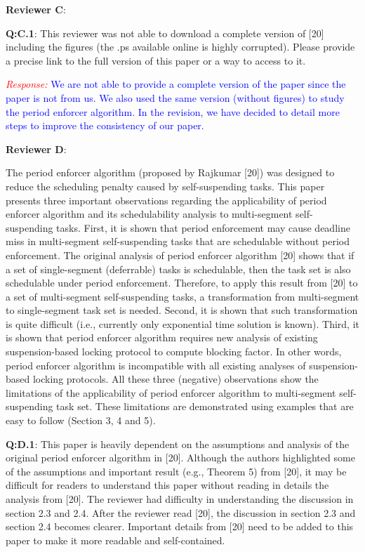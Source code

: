 \documentclass[12pt]{article}
\newcommand{\response}[1]{\textcolor{red}{\emph{Response: }} \textcolor{blue}{#1}\vspace{0.25in}}
\begin{document}
{\bf Reviewer C}:

{\bf Q:C.1}:    
This reviewer was not able to download a complete version of [20] including
the figures (the .ps available online is highly corrupted). Please provide a
precise link to the full version of this paper or a way to access to it. 

\response{We are not able to provide a complete version of the paper since the paper is not from us. We also used the same version (without figures) to study the period enforcer algorithm. In the revision, we have decided to detail more steps to improve the consistency of our paper. }

{\bf Reviewer D}:

	The period enforcer algorithm (proposed by Rajkumar [20]) was designed to
reduce the scheduling penalty caused by self-suspending tasks. This paper
presents three important observations regarding the applicability of period
enforcer algorithm and its schedulability analysis to multi-segment
self-suspending tasks. First, it is shown that period enforcement may cause
deadline miss in multi-segment self-suspending tasks that are schedulable
without period enforcement. The original analysis of period enforcer
algorithm [20] shows that if a set of single-segment (deferrable) tasks is
schedulable, then the task set is also schedulable under period enforcement.
Therefore, to apply this result from [20] to a set of multi-segment
self-suspending tasks, a transformation from multi-segment to single-segment
task set is needed. Second, it is shown that such transformation is quite
difficult (i.e., currently only exponential time solution is known). Third,
it is shown that period enforcer algorithm requires new analysis of existing
suspension-based locking protocol to compute blocking factor. In other
words, period enforcer algorithm is incompatible with all existing analyses
of suspension-based locking protocols. All these three (negative)
observations show the limitations of the applicability of period enforcer
algorithm to multi-segment self-suspending task set. These limitations are
demonstrated using examples that are easy to follow (Section 3, 4 and 5).  


{\bf Q:D.1}:  
This paper is heavily dependent on the assumptions and analysis of the
original period enforcer algorithm in [20]. Although the authors highlighted
some of the assumptions and important result (e.g., Theorem 5) from [20], it
may be difficult for readers to understand this paper without reading in
details the analysis from [20]. The reviewer had difficulty in understanding
the discussion in section 2.3 and 2.4. After the reviewer read [20], the
discussion in section 2.3 and section 2.4 becomes clearer. Important details
from [20] need to be added to this paper to make it more readable and
self-contained.
\end{document}
